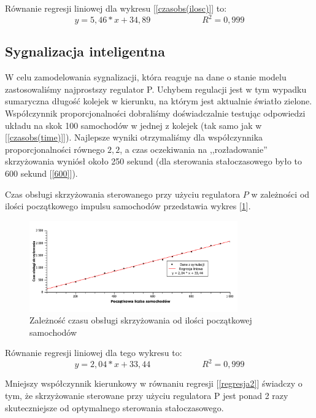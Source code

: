 \documentclass[11pt]{aghdpl}
\begin{document}
Równanie regresji liniowej dla wykresu [\ref{czasobs(ilosc)}] to:
\begin{equation}
	 y = 5,46 * x + 34,89 \qquad \qquad \qquad R^2 = 0,999
\end{equation}

\subsection{Sygnalizacja inteligentna}
W celu zamodelowania sygnalizacji, która reaguje na dane o stanie modelu zastosowaliśmy najprostszy regulator P. Uchybem regulacji jest w tym wypadku sumaryczna długość kolejek w kierunku, na którym jest aktualnie światło zielone.
Współczynnik proporcjonalności dobraliśmy doświadczalnie testując odpowiedzi układu na skok 100 samochodów w jednej z kolejek (tak samo jak w [\ref{czasobs(time)}]). Najlepsze wyniki otrzymaliśmy dla współczynnika proporcjonalności równego $2,2$, a czas oczekiwania na ,,rozładowanie'' skrzyżowania wyniósł około 250 sekund (dla sterowania stałoczasowego było to 600 sekund [\ref{600}]).

Czas obsługi skrzyżowania sterowanego przy użyciu regulatora $P$ w zależności od ilości początkowego impulsu samochodów przedstawia wykres [\ref{czasobs(ilosc)2}].

\newpage

\begin{figure}[h!]
	\centering
	\includegraphics[width=0.80\textwidth]{czasobs(ilosc)2.pdf}
	\caption{Zależność czasu obsługi skrzyżowania od ilości początkowej samochodów}	
	\label{czasobs(ilosc)2}
\end{figure}

Równanie regresji liniowej dla tego wykresu to:
\begin{equation}
	 y = 2,04 * x + 33,44 \qquad \qquad \qquad R^2 = 0,999 
	 \label{regresja2}
\end{equation}

Mniejszy współczynnik kierunkowy w równaniu regresji [\ref{regresja2}] świadczy o tym, że skrzyżowanie sterowane przy użyciu regulatora P jest ponad 2 razy skuteczniejsze od optymalnego sterowania stałoczasowego.
\end{document}
